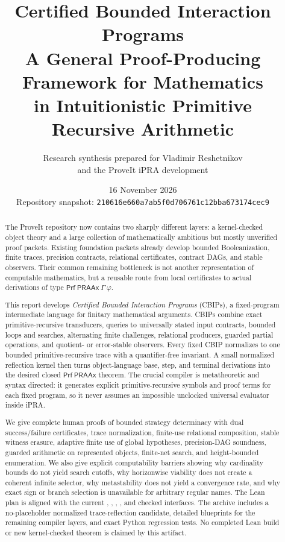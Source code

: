 \documentclass[11pt,oneside]{article}
\title{\textbf{Certified Bounded Interaction Programs}\\[0.25em]
A General Proof-Producing Framework for Mathematics\\
in Intuitionistic Primitive Recursive Arithmetic}
\author{Research synthesis prepared for Vladimir Reshetnikov\\
and the ProveIt iPRA development}
\date{16 November 2026\\Repository snapshot: \texttt{210616e660a7ab5f0d706761c12bba673174cec9}}
\theoremstyle{remark}
\newcommand{\Prf}{\mathsf{Prf}}
\newcommand{\PRAAx}{\mathsf{PRAAx}}
\newcommand{\code}[1]{\texttt{\detokenize{#1}}}
\begin{document}
\maketitle

\begin{abstract}
The ProveIt repository now contains two sharply different layers: a kernel-checked object theory and a large collection of mathematically ambitious but mostly unverified proof packets.  Existing foundation packets already develop bounded Booleanization, finite traces, precision contracts, relational certificates, contract DAGs, and stable observers.  Their common remaining bottleneck is not another representation of computable mathematics, but a reusable route from local certificates to actual derivations of type \(\Prf\ \PRAAx\ \Gamma\ \varphi\).

This report develops \emph{Certified Bounded Interaction Programs} (CBIPs), a fixed-program intermediate language for finitary mathematical arguments.  CBIPs combine exact primitive-recursive transducers, queries to universally stated input contracts, bounded loops and searches, alternating finite challenges, relational producers, guarded partial operations, and quotient- or error-stable observers.  Every fixed CBIP normalizes to one bounded primitive-recursive trace with a quantifier-free invariant.  A small normalized reflection kernel then turns object-language base, step, and terminal derivations into the desired closed \(\Prf\ \PRAAx\) theorem.  The crucial compiler is metatheoretic and syntax directed: it generates explicit primitive-recursive symbols and proof terms for each fixed program, so it never assumes an impossible unclocked universal evaluator inside iPRA.

We give complete human proofs of bounded strategy determinacy with dual success/failure certificates, trace normalization, finite-use relational composition, stable witness erasure, adaptive finite use of global hypotheses, precision-DAG soundness, guarded arithmetic on represented objects, finite-net search, and height-bounded enumeration.  We also give explicit computability barriers showing why cardinality bounds do not yield search cutoffs, why horizonwise viability does not create a coherent infinite selector, why metastability does not yield a convergence rate, and why exact sign or branch selection is unavailable for arbitrary regular names.  The Lean plan is aligned with the current \code{PR}, \code{PTm}, \code{PRAAx}, \code{PRA.qfInd}, and checked \code{IPRADerivations} interfaces.  The archive includes a no-placeholder normalized trace-reflection candidate, detailed blueprints for the remaining compiler layers, and exact Python regression tests.  No completed Lean build or new kernel-checked theorem is claimed by this artifact.
\end{abstract}
\end{document}
